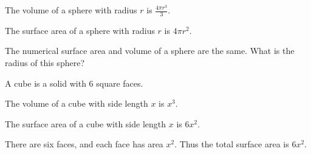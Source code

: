 \documentclass[mast]{lucky}
\begin{document}
\begin{theo}
The volume of a sphere with radius $r$ is $\frac{4\pi r^3}{3}.$
\end{theo}

\begin{theo}
The surface area of a sphere with radius $r$ is $4\pi r^2.$
\end{theo}

\begin{center}
\end{center}


\begin{exer}
The numerical surface area and volume of a sphere are the same. What is the radius of this sphere?
\end{exer}


\begin{defi}[Cube]
A cube is a solid with $6$ square faces.
\end{defi}

\begin{theo}
The volume of a cube with side length $x$ is $x^3.$
\end{theo}

\begin{theo}
The surface area of a cube with side length $x$ is $6x^2.$
\end{theo}

\begin{pro}
There are six faces, and each face has area $x^2.$ Thus the total surface area is $6x^2.$
\end{pro}

\begin{center}
\end{center}
\end{document}
